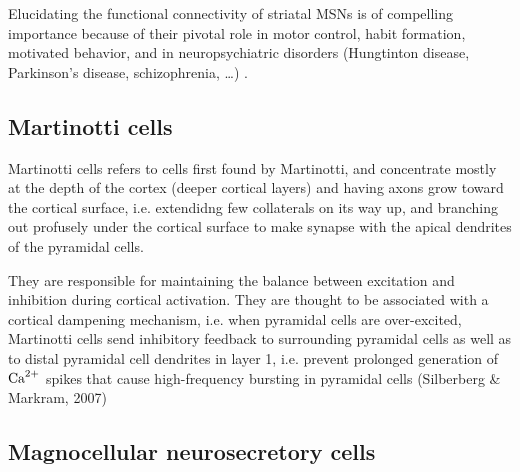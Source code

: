 
\begin{mdframed}

Elucidating the functional connectivity of striatal MSNs is of compelling
importance because of their pivotal role in motor control, habit formation,
motivated behavior, and in neuropsychiatric disorders (Hungtinton disease,
Parkinson's disease, schizophrenia, \ldots) \citep{chuhma2011}.

\end{mdframed}





\subsection{Martinotti cells}
\label{sec:Martinotti-cell}

Martinotti cells refers to cells first found by Martinotti, and concentrate
mostly at the depth of the cortex (deeper cortical layers) and having axons grow
toward the cortical surface, i.e. extendidng few collaterals on its way up, and
branching out profusely under the cortical surface to make synapse with the
apical dendrites of the pyramidal cells.
 

They are responsible for maintaining the balance between excitation and
inhibition during cortical activation. They are thought to be associated with a
cortical dampening mechanism, i.e. when pyramidal cells are over-excited,
Martinotti cells send inhibitory feedback to surrounding pyramidal cells as well
as to distal pyramidal cell dendrites in layer 1, i.e. prevent prolonged
generation of ${\text{Ca}^{2+}}$ spikes that cause high-frequency bursting in pyramidal cells
(Silberberg \& Markram, 2007)
 
  
\subsection{Magnocellular neurosecretory cells}
\label{sec:magn-neur-cells}
\label{sec:Magnocellular-neurosecretory-cell}
\label{sec:Hering-body}

